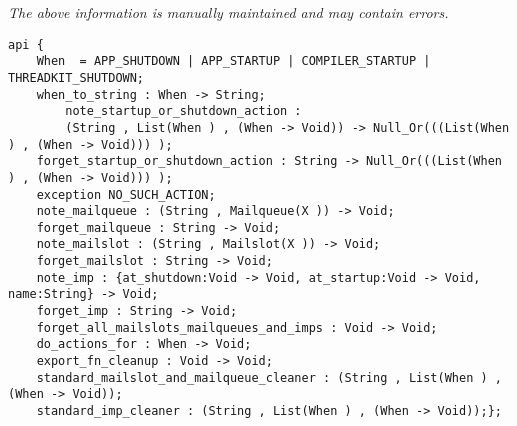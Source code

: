 \label{pkg:run\_at}

{\tiny \it The above information is manually maintained and may contain errors.}
\begin{verbatim}
api {
    When  = APP_SHUTDOWN | APP_STARTUP | COMPILER_STARTUP | THREADKIT_SHUTDOWN;
    when_to_string : When -> String;
        note_startup_or_shutdown_action :
        (String , List(When ) , (When -> Void)) -> Null_Or(((List(When ) , (When -> Void))) );
    forget_startup_or_shutdown_action : String -> Null_Or(((List(When ) , (When -> Void))) );
    exception NO_SUCH_ACTION;
    note_mailqueue : (String , Mailqueue(X )) -> Void;
    forget_mailqueue : String -> Void;
    note_mailslot : (String , Mailslot(X )) -> Void;
    forget_mailslot : String -> Void;
    note_imp : {at_shutdown:Void -> Void, at_startup:Void -> Void, name:String} -> Void;
    forget_imp : String -> Void;
    forget_all_mailslots_mailqueues_and_imps : Void -> Void;
    do_actions_for : When -> Void;
    export_fn_cleanup : Void -> Void;
    standard_mailslot_and_mailqueue_cleaner : (String , List(When ) , (When -> Void));
    standard_imp_cleaner : (String , List(When ) , (When -> Void));};
\end{verbatim}
